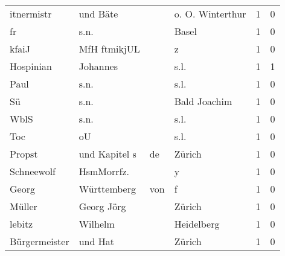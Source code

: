 \begin{tabular}{llllrr}
               itnermistr &                           und Bäte &             &                            o. O. Winterthur &          1 &         0 \\
                       fr &                               s.n. &             &                                       Basel &          1 &         0 \\
                    kfaiJ &                       MfH ftmikjUL &             &                                           z &          1 &         0 \\
                Hospinian &                           Johannes &             &                                        s.l. &          1 &         1 \\
                     Paul &                               s.n. &             &                                        s.l. &          1 &         0 \\
                       Sü &                               s.n. &             &                                Bald Joachim &          1 &         0 \\
                     WblS &                               s.n. &             &                                        s.l. &          1 &         0 \\
                      Toc &                                 oU &             &                                        s.l. &          1 &         0 \\
                   Propst &                      und Kapitel s &          de &                                      Zürich &          1 &         0 \\
               Schneewolf &                         HsmMorrfz. &             &                                           y &          1 &         0 \\
                    Georg &                        Württemberg &         von &                                           f &          1 &         0 \\
                   Müller &                         Georg Jörg &             &                                      Zürich &          1 &         0 \\
                   lebitz &                            Wilhelm &             &                                  Heidelberg &          1 &         0 \\
            Bürgermeister &                            und Hat &             &                                      Zürich &          1 &         0 \\

\end{tabular}
